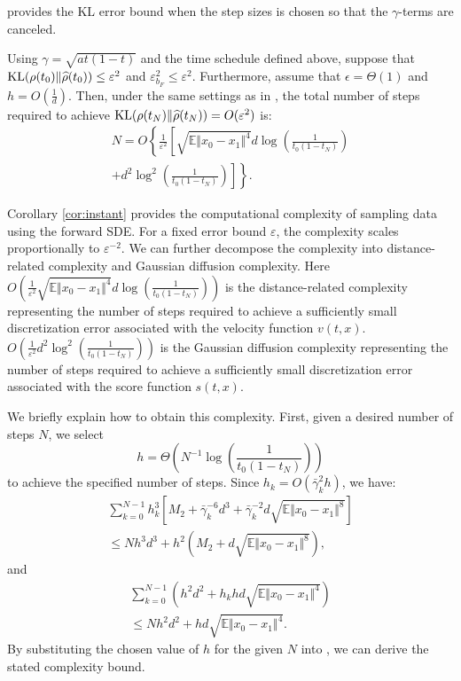  provides the KL error bound when the step sizes is chosen so that the $\gamma$-terms are canceled.

\begin{corollary}
    Using $\gamma=\sqrt{at(1-t)}$ and the time schedule defined above, suppose that $\textnormal{KL}(\rho(t_0)\Vert\hat{\rho}(t_0))\le\varepsilon^2$ and $\varepsilon^2_{b_F}\le\varepsilon^2$. Furthermore, assume that $\epsilon=\Theta(1)$ and $h=O(\frac{1}{d})$. Then, under the same settings as in , the total number of steps required to achieve $\textnormal{KL}(\rho(t_N)\Vert\hat{\rho}(t_N))=O(\varepsilon^2)$ is:
    $$\begin{aligned}
        N=O\left\{\frac{1}{\varepsilon^2}\left[\sqrt{\mathbb{E}\Vert x_0-x_1\Vert^4}d\log\left(\frac{1}{t_0(1-t_N)}\right)\right.\right.\\
        \left.\left.+d^2\log^2\left(\frac{1}{t_0(1-t_N)}\right)\right]\right\}.
    \end{aligned}$$
    \label{cor:instant}
\end{corollary}


Corollary \ref{cor:instant} provides the computational complexity of sampling data using the forward SDE. For a fixed error bound $\varepsilon$, the complexity scales proportionally to $\varepsilon^{-2}$. We can further decompose the complexity into distance-related complexity and Gaussian diffusion complexity. 
Here $O\left(\frac{1}{\varepsilon^2}\sqrt{\mathbb{E}\Vert x_0-x_1\Vert^4}d\log\left(\frac{1}{t_0(1-t_N)}\right)\right)$ is the distance-related complexity representing the number of steps required to achieve a sufficiently small discretization error associated with the velocity function $v(t, x)$. $O\left(\frac{1}{\varepsilon^2}d^2\log^2\left(\frac{1}{t_0(1-t_N)}\right)\right)$ is the Gaussian diffusion complexity  representing the number of steps required to achieve a sufficiently small discretization error associated with the score function $s(t, x)$.

We briefly explain how to obtain this complexity. First, given a desired number of steps $N$, we select $$h=\Theta\left(N^{-1}\log\left(\frac{1}{t_0(1-t_N)}\right)\right)$$
to achieve the specified number of steps. Since $h_k=O(\bar{\gamma}_k^2h)$, we have: 
$$\begin{aligned}
    \sum_{k=0}^{N-1}h_k^3\left[M_2+\bar{\gamma}_k^{-6}d^3+\bar{\gamma}_k^{-2}d\sqrt{\mathbb{E}\Vert x_0-x_1\Vert^{8}}\right]\\\le Nh^3d^3+h^2\left(M_2+d\sqrt{\mathbb{E}\Vert x_0-x_1\Vert^8}\right),
\end{aligned}$$
and 
$$\begin{aligned}
    \sum_{k=0}^{N-1}\left(h^2d^2+h_khd\sqrt{\mathbb{E}\Vert x_0-x_1\Vert^4}\right)\\
    \le Nh^2d^2+hd\sqrt{\mathbb{E}\Vert x_0-x_1\Vert^4}.
\end{aligned}$$
By substituting the chosen value of $h$ for the given $N$ into , we can derive the stated complexity bound.

